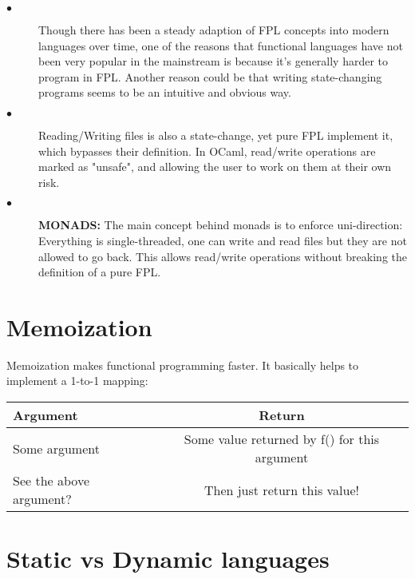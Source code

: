 \documentclass[twoside]{article}
\begin{document}
\begin{description}
  \item[$\bullet$] Though there has been a steady adaption of FPL concepts into modern languages over time, one of the reasons that functional languages have not been very popular in the mainstream is because it's generally harder to program in FPL. Another reason could be that writing state-changing programs seems to be an intuitive and obvious way.
  
  \item[$\bullet$] Reading/Writing files is also a state-change, yet pure FPL implement it, which bypasses their definition. In OCaml, read/write operations are marked as "unsafe", and allowing the user to work on them at their own risk.

  \item[$\bullet$] \textbf{MONADS:} The main concept behind monads is to enforce uni-direction: Everything is single-threaded, one can write and read files but they are not allowed to go back. This allows read/write operations without breaking the definition of  a pure FPL.

\end{description}

\section{Memoization}

Memoization makes functional programming faster. It basically helps to implement a 1-to-1 mapping:

\begin{table}[ht]
  \centering
  \label{tab:table1}
  \begin{tabular}{l|c}
    \textbf{Argument} & \textbf{Return} \\
    \hline
    Some argument & Some value returned by f() for this argument \\
      \hline
    See the above argument? & Then just return this value! \\
 
  \end{tabular}
  
\end{table}

\section{Static vs Dynamic languages}
\end{document}

